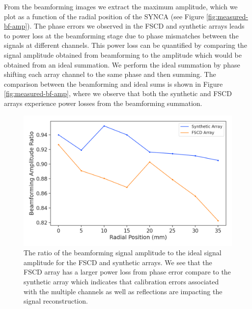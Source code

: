 From the beamforming images we extract the maximum amplitude, which we plot as a function of the radial position of the SYNCA (see Figure \ref{fig:measured-bf-amp}). The phase errors we observed in the FSCD and synthetic arrays leads to power loss at the beamforming stage due to phase mismatches between the signals at different channels. This power loss can be quantified by comparing the signal amplitude obtained from beamforming to the amplitude which would be obtained from an ideal summation. We perform the ideal summation by phase shifting each array channel to the same phase and then summing. The comparison between the beamforming and ideal sums is shown in Figure \ref{fig:measured-bf-amp}, where we observe that both the synthetic and FSCD arrays experience power losses from the beamforming summation. 

\begin{figure}[htbp]
    \centering
    \includegraphics[width=.6\textwidth]{figs/Chapter-5/230509_beamformed_idealsum_ratio_compare.png}
    \caption{The ratio of the beamforming signal amplitude to the ideal signal amplitude for the FSCD and synthetic arrays. We see that the FSCD array has a larger power loss from phase error compare to the synthetic array which indicates that calibration errors associated with the multiple channels as well as reflections are impacting the signal reconstruction. }
    \label{fig:jugaad-synth-bf-amp-ratio}
\end{figure}

